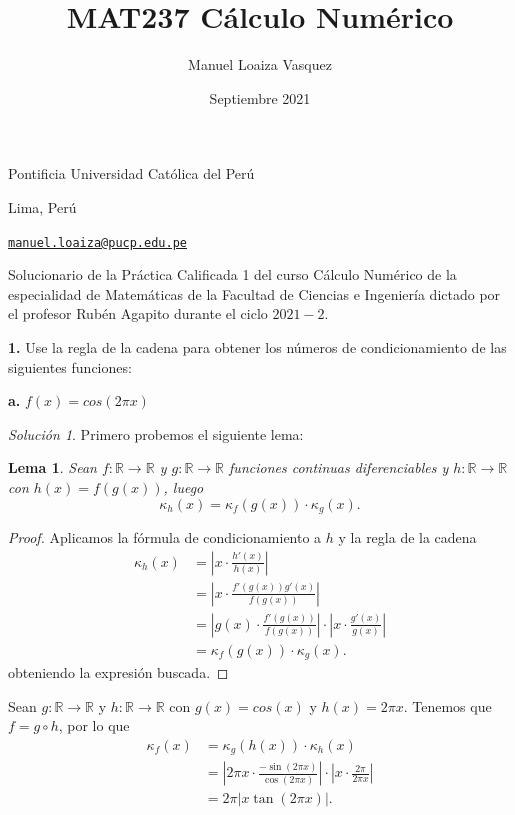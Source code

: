\documentclass{article}
\title{MAT237 C\'alculo Num\'erico}
\author{Manuel Loaiza Vasquez}
\date{Septiembre 2021}
\newenvironment{statement}[1]{\smallskip\noindent\color[rgb]{1.00,0.00,0.50} {\bf #1.}}{}
\newtheorem{lemma}[theorem]{Lema}
\theoremstyle{definition}
\theoremstyle{remark}
\newtheorem*{solution}{Soluci\'on}
\newcommand{\BR}{\mathbb R}
\begin{document}
\maketitle

\vspace*{-0.25in}
\centerline{Pontificia Universidad Cat\'olica del Per\'u}
\centerline{Lima, Per\'u}
\centerline{\href{mailto:manuel.loaiza@pucp.edu.pe}{{\tt manuel.loaiza@pucp.edu.pe}}}
\vspace*{0.15in}

\begin{framed}
  Solucionario de la Pr\'actica Calificada 1 del curso C\'alculo Num\'erico
  de la especialidad de Matem\'aticas de la Facultad de Ciencias e Ingenier\'ia
  dictado por el profesor Rub\'en Agapito durante el ciclo $2021-2$.
\end{framed}

\begin{statement}{1}
  Use la regla de la cadena para obtener los n\'umeros de condicionamiento de
  las siguientes funciones:
\end{statement}

\begin{statement}{a}
  $f(x) = cos(2 \pi x)$
\end{statement}

\begin{solution}
  Primero probemos el siguiente lema:

  \begin{lemma}
    \label{lemma01}
    Sean $f:\BR \to \BR$ y $g:\BR \to \BR$ funciones continuas diferenciables y
    $h: \BR \to \BR$ con $h(x) = f(g(x))$, luego
    \[
      \kappa_h(x) = \kappa_f(g(x)) \cdot \kappa_g(x).
    \]
  \end{lemma}

  \begin{proof}
    Aplicamos la f\'ormula de condicionamiento a $h$ y la regla de la cadena
    \begin{align*}
      \kappa_h(x) &= \left|x \cdot \frac{h'(x)}{h(x)}\right|\\
      &= \left|x \cdot \frac{f'(g(x)) g'(x)}{f(g(x))}\right|\\
      &= \left|g(x) \cdot \frac{f'(g(x))}{f(g(x))}\right| \cdot \left|x \cdot \frac{g'(x)}{g(x)}\right|\\
      &= \kappa_f(g(x)) \cdot \kappa_g(x).
    \end{align*}
    obteniendo la expresi\'on buscada.
  \end{proof}

  Sean $g: \BR \to \BR$ y $h: \BR \to \BR$ con $g(x) = cos(x)$ y $h(x) = 2 \pi x$.
  Tenemos que $f = g \circ h$, por lo que
  \begin{align*}
    \kappa_f(x) &= \kappa_g(h(x)) \cdot \kappa_h(x)\\
    &= \left|2 \pi x \cdot \frac{-\sin(2 \pi x)}{\cos(2 \pi x)}\right| \cdot \left|x \cdot \frac{2 \pi}{2 \pi x}\right|\\
    &= 2\pi|x \tan(2 \pi x)|.
  \end{align*}
\end{solution}
\end{document}
